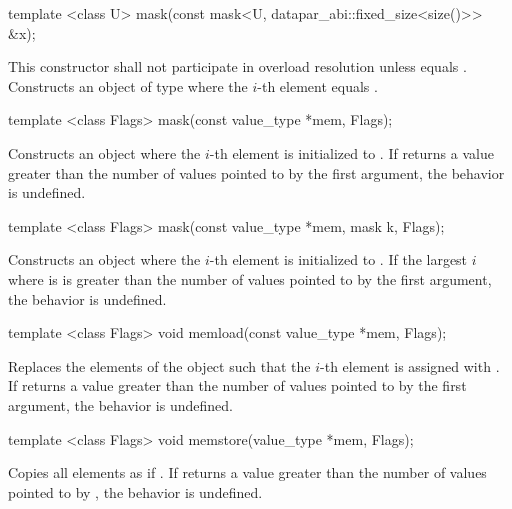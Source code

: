 \begin{itemdecl}
template <class U> mask(const mask<U, datapar_abi::fixed_size<size()>> &x);
\end{itemdecl}
\begin{itemdescr}
  \pnum\remarks This constructor shall not participate in overload resolution unless
     equals \fixedsizescoped{}.
  \pnum\effects Constructs an object of type \mask where the $i$-th element equals  \foralli.
\end{itemdescr}

\begin{itemdecl}
template <class Flags> mask(const value_type *mem, Flags);
\end{itemdecl}
\begin{itemdescr}
  \pnum\effects Constructs an object where the $i$-th element is initialized to  \foralli.
  \pnum\remarks If  returns a value greater than the number of values pointed to by the first argument, the behavior is undefined.
  \flagsRemarks{\mask{}}
\end{itemdescr}

\begin{itemdecl}
template <class Flags> mask(const value_type *mem, mask k, Flags);
\end{itemdecl}
\begin{itemdescr}
  \pnum\effects Constructs an object where the $i$-th element is initialized to  \foralli.
  \pnum\remarks If the largest $i$ where  is \true is greater than the number of values pointed to by the first argument, the behavior is undefined.
  \flagsRemarks{\mask{}}
\end{itemdescr}

\begin{itemdecl}
template <class Flags> void memload(const value_type *mem, Flags);
\end{itemdecl}
\begin{itemdescr}
  \pnum\effects Replaces the elements of the \mask object such that the $i$-th element is assigned with  \foralli.
  \pnum\remarks If  returns a value greater than the number of values pointed to by the first argument, the behavior is undefined.
  \flagsRemarks{\mask{}}
\end{itemdescr}

\begin{itemdecl}
template <class Flags> void memstore(value_type *mem, Flags);
\end{itemdecl}
\begin{itemdescr}
  \pnum\effects Copies all \mask elements as if  \foralli.
  \pnum\remarks If  returns a value greater than the number of values pointed to by , the behavior is undefined.
  \flagsRemarks{\mask{}}
\end{itemdescr}

